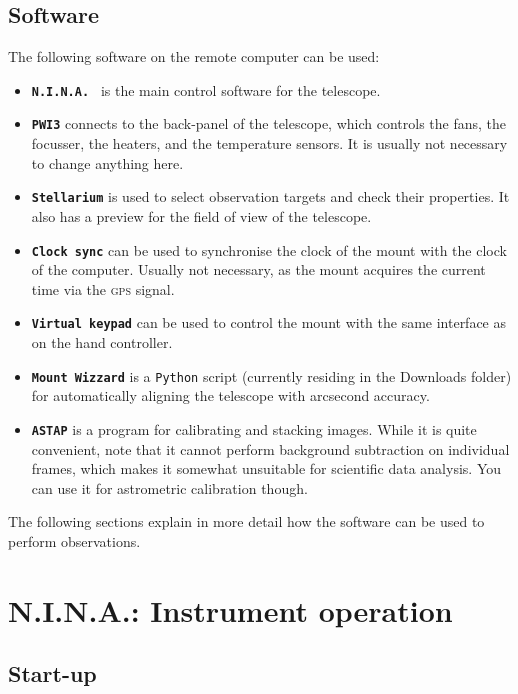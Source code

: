 \documentclass[a4paper, 11pt, fleqn]{memoir}
\begin{document}
\subsection{Software}
The following software on the remote computer can be used:
\begin{itemize}
    \item \textbf{\texttt{N.I.N.A.
              }} is the main control software for the telescope.
    \item
          \textbf{\texttt{PWI3}} connects to the back-panel of the telescope, which controls the fans, the focusser, the heaters, and the temperature sensors.
          It is usually not necessary to change anything here.
    \item
          \textbf{\texttt{Stellarium}} is used to select observation targets and check their properties.
          It also has a preview for the field of view of the telescope.
    \item
          \textbf{\texttt{Clock sync}} can be used to synchronise the clock of the mount with the clock of the computer. Usually not necessary, as the mount acquires the current time via the \textsc{gps} signal.
    \item
          \textbf{\texttt{Virtual keypad}} can be used to control the mount with the same interface as on the hand controller.
    \item
          \textbf{\texttt{Mount Wizzard}} is a \texttt{Python} script (currently residing in the Downloads folder) for automatically aligning the telescope with arcsecond accuracy.
    \item
          \textbf{\texttt{ASTAP}} is a program for calibrating and stacking images.
          While it is quite convenient, note that it cannot perform background subtraction on individual frames, which makes it somewhat unsuitable for scientific data analysis.
          You can use it for astrometric calibration though.
\end{itemize}
The following sections explain in more detail how the software can be used to perform observations.

\section{N.I.N.A.: Instrument operation}

\subsection{Start-up}\label{sec:NINA:start-up}
\end{document}
